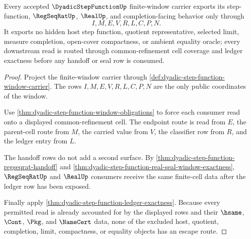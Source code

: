 \begin{theorem}
\label{thm:dyadic-step-function-nonescape}
Every accepted $\DyadicStepFunctionUp$ finite-window carrier exports its step-function, $\RegSeqRatUp$, $\RealUp$, and completion-facing behavior only through
$$
I,M,E,V,R,L,C,P,N.
$$
It exports no hidden host step function, quotient representative, selected limit, measure completion, open-cover compactness, or ambient equality oracle; every downstream read is routed through common-refinement cell coverage and ledger exactness before any handoff or seal row is consumed.
\end{theorem}
\begin{proof}
Project the finite-window carrier through \autoref{def:dyadic-step-function-window-carrier}. The rows $I,M,E,V,R,L,C,P,N$ are the only public coordinates of the window.

Use \autoref{thm:dyadic-step-function-window-obligations} to force each consumer read onto a displayed common-refinement cell. The endpoint route is read from $E$, the parent-cell route from $M$, the carried value from $V$, the classifier row from $R$, and the ledger entry from $L$.

The handoff rows do not add a second surface. By \autoref{thm:dyadic-step-function-regseqrat-handoff} and \autoref{thm:dyadic-step-function-real-seal-window-exactness}, $\RegSeqRatUp$ and $\RealUp$ consumers receive the same finite-cell data after the ledger row has been exposed.

Finally apply \autoref{thm:dyadic-step-function-ledger-exactness}. Because every permitted read is already accounted for by the displayed rows and their $\hsame$, $\Cont$, $\Pkg$, and $\NameCert$ data, none of the excluded host, quotient, completion, limit, compactness, or equality objects has an escape route.
\end{proof}

